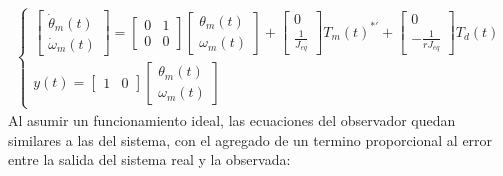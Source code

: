 \documentclass[a4paper, 10pt, onecolumn,journal]{ieeeconf}
\begin{document}
\begin{align}
	\begin{cases}
		\begin{bmatrix}
			\dot{\theta}_m(t) \\ 
			\dot{\omega}_m(t)
		\end{bmatrix} = 
		\begin{bmatrix}
			0 & 1 \\ 
			0 & 0
		\end{bmatrix}
		\begin{bmatrix}
			{\theta}_m(t) \\ 
			{\omega}_m(t)
		\end{bmatrix} + 
		\begin{bmatrix}
			0 \\ 
			\frac{1}{J_{eq}}
		\end{bmatrix} {T_m(t)}^{*'} +
		\begin{bmatrix}
			0 \\ 
			-\frac{1}{r J_{eq}}
		\end{bmatrix} T_d(t)\\
		y(t) = \begin{bmatrix}
			1 & 0
		\end{bmatrix} \begin{bmatrix}
		{\theta}_m(t) \\ 
		{\omega}_m(t)
		\end{bmatrix}
	\end{cases}\label{ecuacion matricial de subsistema mecanico compensado}
\end{align}
Al asumir un funcionamiento ideal, las ecuaciones del observador quedan similares a las del sistema, con el agregado de un termino proporcional al error entre la salida del sistema real y la observada:
\end{document}
